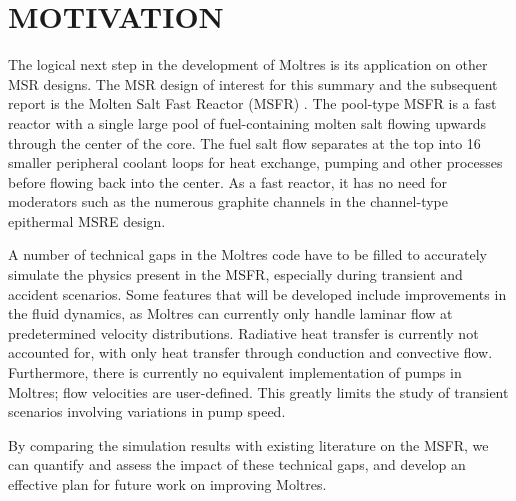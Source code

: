 \documentclass{anstrans}
\begin{document}
\section{MOTIVATION}

The logical next step in the development of Moltres is its application on other MSR designs. The MSR design of interest for this summary and the subsequent report is the Molten Salt Fast Reactor (MSFR) \cite{serp_molten_2014}. The pool-type MSFR is a fast reactor with a single large pool of fuel-containing molten salt flowing upwards through the center of the core. The fuel salt flow separates at the top into 16 smaller peripheral coolant loops for heat exchange, pumping and other processes before flowing back into the center. As a fast reactor, it has no need for moderators such as the numerous graphite channels in the channel-type epithermal MSRE design.

A number of technical gaps in the Moltres code have to be filled to accurately simulate the physics present in the MSFR, especially during transient and accident scenarios. Some features that will be developed include improvements in the fluid dynamics, as Moltres can currently only handle laminar flow at predetermined velocity distributions. Radiative heat transfer is currently not accounted for, with only heat transfer through conduction and convective flow. Furthermore, there is currently no equivalent implementation of pumps in Moltres; flow velocities are user-defined. This greatly limits the study of transient scenarios involving variations in pump speed. 

By comparing the simulation results with existing literature on the MSFR, we can quantify and assess the impact of these technical gaps, and develop an effective plan for future work on improving Moltres.



\end{document}
